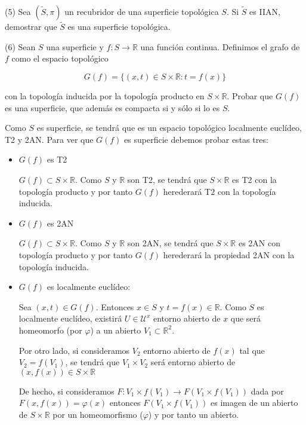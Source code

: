 \documentclass[
  a4paper,
  spanish,
  12pt,
]{scrartcl}
\begin{document}
\begin{ejer}
(5) Sea $(\widetilde{S}, \pi)$ un recubridor de una superficie topológica $S$. Si $\widetilde{S}$ es IIAN, demostrar que $\widetilde{S}$ es una superficie topológica.\\
\end{ejer}

\begin{ejer}
(6) Sean $S$ una superficie y $f: S \rightarrow \mathbb{R}$ una función continua. Definimos el grafo de $f$ como el espacio topológico

$$
G(f)=\{(x, t) \in S \times \mathbb{R}: t=f(x)\}
$$

con la topología inducida por la topología producto en $S \times \mathbb{R}$. Probar que $G(f)$ es una superficie, que además es compacta si y sólo si lo es $S$.\\
\end{ejer}

\begin{sol}
	Como $S$ es superficie, se tendrá que es un espacio topológico localmente euclídeo, T2 y 2AN.
	Para ver que $G(f)$ es superficie debemos probar estas tres:
	\begin{itemize}
		\item{$G(f)$ es T2}
		
		$G(f) \subset S \times \mathbb{R}$. Como $S$ y $\mathbb{R}$ son T2, se tendrá que $S \times \mathbb{R}$ es T2 con la topología producto y por tanto $G(f)$ herederará T2 con la topología inducida.
		
		\item{$G(f)$ es 2AN}
		
		$G(f) \subset S \times \mathbb{R}$. Como $S$ y $\mathbb{R}$ son 2AN, se tendrá que $S \times \mathbb{R}$ es 2AN con topología producto y por tanto $G(f)$ herederará la propiedad 2AN con la topología inducida.
		
		\item{$G(f)$ es localmente euclídeo}:
		
		Sea $(x,t) \in G(f)$. Entonces $x \in S$ y $t = f(x) \in \mathbb{R}$. Como $S$ es localmente euclídeo, existirá $U \in \mathcal{U}^x$ entorno abierto de $x$ que será homeomorfo (por $\varphi$) a un abierto $V_1\subset \mathbb{R}^2$.
		
		Por otro lado, si consideramos $V_2$ entorno abierto de $f(x)$ tal que $V_2=f(V_1)$, se tendrá que $V_1 \times V_2$ será entorno abierto de $(x,f(x)) \in S \times \mathbb{R}$
		
		De hecho, si consideramos $F: V_1 \times f(V_1) \rightarrow F(V_1 \times f(V_1))$
		dada por $F(x,f(x)) = \varphi(x)$ entonces $F(V_1 \times f(V_1))$ es imagen de un abierto de $S \times \mathbb{R}$ por un homeomorfismo ($\varphi$) y por tanto un abierto.
		
		
	\end{itemize}
	
\end{sol}
\end{document}
